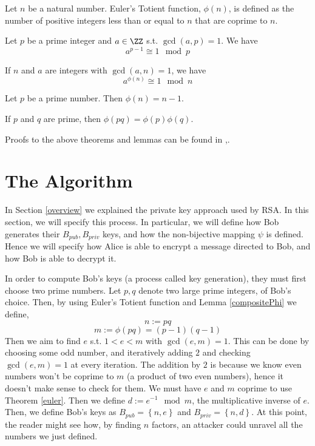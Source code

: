\documentclass[11pt]{scrartcl}
\begin{document}
\begin{definition}
  Let $n$ be a natural number. Euler's Totient function, $\phi (n)$, is defined as the
  number of positive integers less than or equal to $n$ that are coprime to $n$.
  \label{totient}
\end{definition}

\begin{theorem} 
  Let $p$ be a prime integer and $a\in\ZZ$ s.t. $\gcd (a,p)=1$. We have
  \[a^{p-1}\cong 1 \mod p\]
  \label{fermat}
\end{theorem}

\begin{theorem}
  If $n$ and $a$ are integers with $\gcd (a,n)=1$, we have
  \[a^{\phi (n)} \cong 1 \mod n\]
  \label{euler}
\end{theorem}

\begin{lemma}
  Let $p$ be a prime number. Then $\phi(n) = n-1$.
  \label{trivialP}
\end{lemma}
\begin{lemma}
  If $p$ and $q$ are prime, then $\phi (pq)=\phi(p) \phi(q)$.
  \label{compositePhi}
\end{lemma}
Proofs to the above theorems and lemmas can be found in \cite{liebeck},\cite{maxey}.

\section{The Algorithm}\label{algo}
In Section \ref{overview} we explained the private key approach used by RSA. In this
section, we will specify this process. In particular, we will define how Bob generates
their $B_{pub}, B_{priv}$ keys, and how the non-bijective mapping $\psi$ is defined. Hence
we will specify how Alice is able to encrypt a message directed to Bob, and how Bob is
able to decrypt it.

In order to compute Bob's keys (a process called key generation), they must first choose
two prime numbers. Let $p, q$ denote two large prime integers, of Bob's choice. Then, by using
Euler's Totient function and Lemma \ref{compositePhi} we define,
\[n:=pq\]
\[m:=\phi(pq) = (p-1)(q-1)\]
Then we aim to find $e$ s.t. $1<e<m$ with $\gcd (e, m)=1$. This can be done by choosing
some odd number, and iteratively adding $2$ and checking $\gcd (e, m)=1$ at every iteration.
The addition by $2$ is because we know even numbers won't be coprime to $m$ (a product of
two even numbers), hence it doesn't make sense to check for them. We must have $e$ and $m$
coprime to use Theorem \ref{euler}.  Then we define $d:=e^{-1}\mod m$, the multiplicative
inverse of $e$.  Then, we define Bob's keys as $B_{pub}=\left\{ n, e \right\}$ and
$B_{priv}=\left\{ n, d \right\}$. At this point, the reader might see how, by finding $n$
factors, an attacker could unravel all the numbers we just defined.
\end{document}
